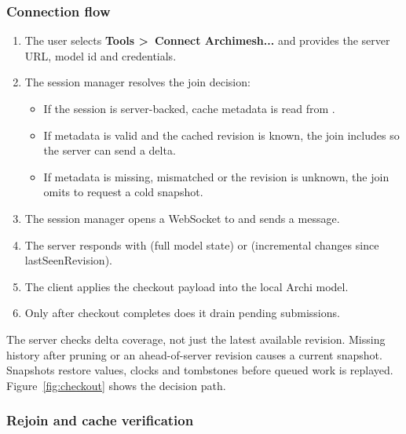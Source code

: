 \subsubsection{Connection flow}

\begin{enumerate}
\item The user selects \textbf{Tools \textgreater\ Connect Archimesh...} and
  provides the server URL, model id and credentials.
\item The session manager resolves the join decision:
  \begin{itemize}
  \item If the session is server-backed, cache metadata is read from
    .
  \item If metadata is valid and the cached revision is known, the join
    includes  so the server can send a delta.
  \item If metadata is missing, mismatched or the revision is unknown, the
    join omits  to request a cold snapshot.
  \end{itemize}
\item The session manager opens a WebSocket to
   and sends a  message.
\item The server responds with  (full model state)
  or  (incremental changes since lastSeenRevision).
\item The client applies the checkout payload into the local Archi model.
\item Only after checkout completes does it drain pending submissions.
\end{enumerate}

The server checks delta coverage, not just the latest available revision.
Missing history after pruning or an ahead-of-server revision causes a current
snapshot. Snapshots restore values, clocks and tombstones before queued work
is replayed. Figure~\ref{fig:checkout} shows the decision path.


\subsubsection{Rejoin and cache verification}

